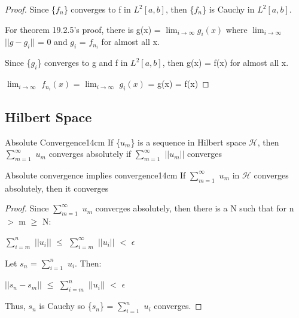     \begin{proof}
        Since \{$f_n$\} converges to f in $L^2[a,b]$,
        then \{$f_n$\} is Cauchy in $L^2[a,b]$.

        For {\color{red} theorem 19.2.5}'s proof,
        there is g(x) = $\lim_{i \rightarrow \infty} g_i(x)$
        where $\lim_{i \rightarrow \infty}$ $||g-g_i||$ = 0 and
        $g_i$ = $f_{n_i}$ for almost all x.
        
        Since \{$g_i$\} converges to g and f in $L^2[a,b]$,
        then g(x) = f(x) for almost all x.

        \hspace{0.5cm}
        $\lim_{i \rightarrow \infty}$ $f_{n_i}(x)$
        = $\lim_{i \rightarrow \infty}$ $g_i(x)$
        = g(x) = f(x)
    \end{proof}

    \newpage





\subsection{ Hilbert Space }

    \begin{definition}{Absolute Convergence}{14cm}
        If \{$u_m$\} is a sequence in Hilbert space $\mathcal{H}$, then
        $\sum_{m=1}^{\infty}$ $u_m$ {\color{lblue} converges absolutely}
        if $\sum_{m=1}^{\infty}$ $||u_m||$ converges
    \end{definition}

    \vspace{0.5cm}



    \begin{wtheorem}{Absolute convergence implies convergence}{14cm}
        If $\sum_{m=1}^{\infty}$ $u_m$ in $\mathcal{H}$ converges absolutely, then
        it converges
    \end{wtheorem}

    \begin{proof}
        Since $\sum_{m=1}^{\infty}$ $u_m$ converges absolutely,
        then there is a N such that for n $>$ m $\geq$ N:

        \hspace{0.5cm}
        $\sum_{i=m}^n$ $||u_i||$
        $\leq$ $\sum_{i=m}^{\infty}$ $||u_i||$
        $<$ $\epsilon$

        Let $s_n$ = $\sum_{i=1}^n$ $u_i$. Then:

        \hspace{0.5cm}
        $||s_n - s_m||$
        $\leq$ $\sum_{i=m}^n$ $||u_i||$
        $<$ $\epsilon$

        Thus, $s_n$ is Cauchy so \{$s_n$\} = $\sum_{i=1}^n$ $u_i$ converges.
    \end{proof}

